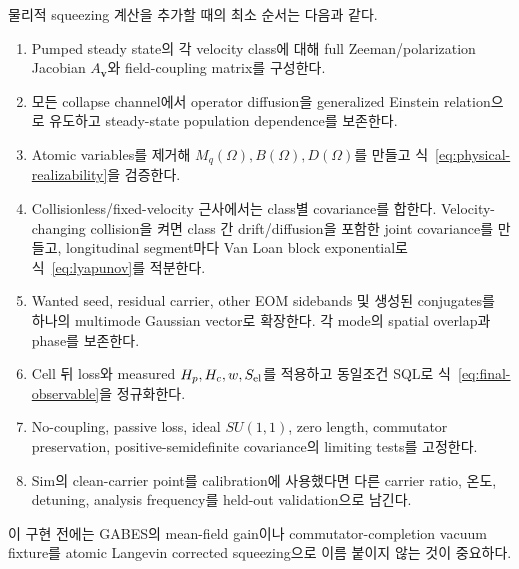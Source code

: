\documentclass[11pt,a4paper]{article}
\begin{document}
물리적 squeezing 계산을 추가할 때의 최소 순서는 다음과 같다.
\begin{enumerate}
\item Pumped steady state의 각 velocity class에 대해 full Zeeman/polarization Jacobian
$A_{\bm v}$와 field-coupling matrix를 구성한다.
\item 모든 collapse channel에서 operator diffusion을 generalized Einstein relation으로
유도하고 steady-state population dependence를 보존한다.
\item Atomic variables를 제거해 $M_q(\Omega),B(\Omega),D(\Omega)$를 만들고
식~\eqref{eq:physical-realizability}을 검증한다.
\item Collisionless/fixed-velocity 근사에서는 class별 covariance를 합한다. Velocity-
changing collision을 켜면 class 간 drift/diffusion을 포함한 joint covariance를 만들고,
longitudinal segment마다 Van Loan block exponential로 식~\eqref{eq:lyapunov}를 적분한다.
\item Wanted seed, residual carrier, other EOM sidebands 및 생성된 conjugates를 하나의
multimode Gaussian vector로 확장한다. 각 mode의 spatial overlap과 phase를 보존한다.
\item Cell 뒤 loss와 measured $H_p,H_c,w,S_{\rm el}$를 적용하고 동일조건 SQL로
식~\eqref{eq:final-observable}을 정규화한다.
\item No-coupling, passive loss, ideal $SU(1,1)$, zero length,
commutator preservation, positive-semidefinite covariance의 limiting tests를 고정한다.
\item Sim의 clean-carrier point를 calibration에 사용했다면 다른 carrier ratio, 온도,
detuning, analysis frequency를 held-out validation으로 남긴다.
\end{enumerate}
이 구현 전에는 GABES의 mean-field gain이나 commutator-completion vacuum fixture를
atomic Langevin corrected squeezing으로 이름 붙이지 않는 것이 중요하다.

\clearpage
\renewcommand{\refname}{참고문헌}


\end{document}
